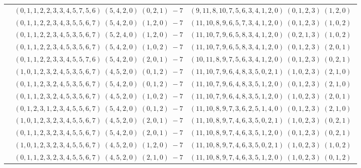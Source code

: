 \documentclass[11pt]{article}
\begin{document}
\begin{longtable}[l]{|c|c|c|}
 \cline{2-3} 
 & $(0 ,1 ,1 ,2 ,2 ,3 ,3 ,4 ,5 ,7 ,5 ,6) \;(5 ,4 ,2 ,0) \;(0 ,2 ,1) \;-7$ & $(9 ,11 ,8 ,10 ,7 ,5 ,6 ,3 ,4 ,1 ,2 ,0) \;(0 ,1 ,2 ,3) \;(1 ,2 ,0) \;$\\ 
 \cline{2-3} 
 & $(0 ,1 ,1 ,2 ,2 ,3 ,4 ,3 ,5 ,5 ,6 ,7) \;(5 ,4 ,2 ,0) \;(1 ,2 ,0) \;-7$ & $(11 ,10 ,8 ,9 ,6 ,5 ,7 ,3 ,4 ,1 ,2 ,0) \;(0 ,1 ,2 ,3) \;(1 ,0 ,2) \;$\\ 
 \cline{2-3} 
 & $(0 ,1 ,1 ,2 ,2 ,3 ,4 ,5 ,3 ,5 ,6 ,7) \;(5 ,2 ,4 ,0) \;(1 ,2 ,0) \;-7$ & $(11 ,10 ,7 ,9 ,6 ,5 ,8 ,3 ,4 ,1 ,2 ,0) \;(0 ,2 ,1 ,3) \;(1 ,0 ,2) \;$\\ 
 \cline{2-3} 
 & $(0 ,1 ,1 ,2 ,2 ,3 ,4 ,5 ,3 ,5 ,6 ,7) \;(5 ,4 ,2 ,0) \;(1 ,0 ,2) \;-7$ & $(11 ,10 ,7 ,9 ,6 ,5 ,8 ,3 ,4 ,1 ,2 ,0) \;(0 ,1 ,2 ,3) \;(2 ,0 ,1) \;$\\ 
 \cline{2-3} 
 & $(0 ,1 ,1 ,2 ,2 ,3 ,3 ,4 ,5 ,5 ,7 ,6) \;(5 ,4 ,2 ,0) \;(2 ,0 ,1) \;-7$ & $(10 ,11 ,8 ,9 ,7 ,5 ,6 ,3 ,4 ,1 ,2 ,0) \;(0 ,1 ,2 ,3) \;(0 ,2 ,1) \;$\\ 
 \cline{2-3} 
 & $(1 ,0 ,1 ,2 ,3 ,2 ,4 ,5 ,3 ,5 ,6 ,7) \;(4 ,5 ,2 ,0) \;(0 ,1 ,2) \;-7$ & $(11 ,10 ,7 ,9 ,6 ,4 ,8 ,3 ,5 ,0 ,2 ,1) \;(1 ,0 ,2 ,3) \;(2 ,1 ,0) \;$\\ 
 \cline{2-3} 
 & $(0 ,1 ,1 ,2 ,3 ,2 ,4 ,5 ,3 ,5 ,6 ,7) \;(5 ,4 ,2 ,0) \;(0 ,1 ,2) \;-7$ & $(11 ,10 ,7 ,9 ,6 ,4 ,8 ,3 ,5 ,1 ,2 ,0) \;(0 ,1 ,2 ,3) \;(2 ,1 ,0) \;$\\ 
 \cline{2-3} 
 & $(0 ,1 ,1 ,2 ,3 ,2 ,4 ,5 ,3 ,5 ,6 ,7) \;(4 ,5 ,2 ,0) \;(1 ,0 ,2) \;-7$ & $(11 ,10 ,7 ,9 ,6 ,4 ,8 ,3 ,5 ,1 ,2 ,0) \;(1 ,0 ,2 ,3) \;(2 ,0 ,1) \;$\\ 
 \cline{2-3} 
 & $(0 ,1 ,2 ,3 ,1 ,2 ,3 ,4 ,5 ,5 ,6 ,7) \;(5 ,4 ,2 ,0) \;(0 ,1 ,2) \;-7$ & $(11 ,10 ,8 ,9 ,7 ,3 ,6 ,2 ,5 ,1 ,4 ,0) \;(0 ,1 ,2 ,3) \;(2 ,1 ,0) \;$\\ 
 \cline{2-3} 
 & $(1 ,0 ,1 ,2 ,3 ,2 ,3 ,4 ,5 ,5 ,6 ,7) \;(4 ,5 ,2 ,0) \;(2 ,0 ,1) \;-7$ & $(11 ,10 ,8 ,9 ,7 ,4 ,6 ,3 ,5 ,0 ,2 ,1) \;(1 ,0 ,2 ,3) \;(0 ,2 ,1) \;$\\ 
 \cline{2-3} 
 & $(0 ,1 ,1 ,2 ,3 ,2 ,3 ,4 ,5 ,5 ,6 ,7) \;(5 ,4 ,2 ,0) \;(2 ,0 ,1) \;-7$ & $(11 ,10 ,8 ,9 ,7 ,4 ,6 ,3 ,5 ,1 ,2 ,0) \;(0 ,1 ,2 ,3) \;(0 ,2 ,1) \;$\\ 
 \cline{2-3} 
 & $(1 ,0 ,1 ,2 ,3 ,2 ,3 ,4 ,5 ,5 ,6 ,7) \;(4 ,5 ,2 ,0) \;(1 ,2 ,0) \;-7$ & $(11 ,10 ,8 ,9 ,7 ,4 ,6 ,3 ,5 ,0 ,2 ,1) \;(1 ,0 ,2 ,3) \;(1 ,0 ,2) \;$\\ 
 \cline{2-3} 
 & $(0 ,1 ,1 ,2 ,3 ,2 ,3 ,4 ,5 ,5 ,6 ,7) \;(4 ,5 ,2 ,0) \;(2 ,1 ,0) \;-7$ & $(11 ,10 ,8 ,9 ,7 ,4 ,6 ,3 ,5 ,1 ,2 ,0) \;(1 ,0 ,2 ,3) \;(0 ,1 ,2) \;$\\ 

\end{longtable}
\end{document}
